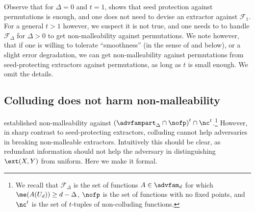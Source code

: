 \documentclass{toc}
\begin{document}
Observe that for $\Delta = 0$ and $t = 1$,  shows that seed protection against
permutations is enough, and one does not need to devise an extractor against $\mathcal{F}_1$.
For a general $t > 1$ however, we suspect it is not true, and one needs to to handle $\mathcal{F}_\Delta$
for $\Delta > 0$ to get non-malleability against permutations. We note however, that if one is willing
to tolerate ``smoothness'' (in the sense of  and  below), or a slight
error degradation, we can get non-malleability against permutations from seed-protecting extractors
against permutations, as long as $t$ is small enough. We omit the details.

\subsection{Colluding does not harm non-malleability}\label{sec:no nc}

 established non-malleability against $\left(\advfampart_{\Delta} \cap \nofp\right)^t \cap \nc^t$.\footnote{We recall that $\mathcal{F}_{\Delta}$ is the set of functions $A \in \advfam_d$ for which $\me(A(U_d)) \ge d-\Delta$, $\nofp$ is the set of functions with no fixed points, and $\nc^t$ is
the set of $t$-tuples of non-colluding functions.}
However, in sharp contrast to seed-protecting extractors, colluding cannot help
adversaries in breaking non-malleable extractors. Intuitively this should be clear, as
redundant information should not help the adversary in distinguishing $\ext(X,Y)$
from uniform. Here we make it formal.
\end{document}
